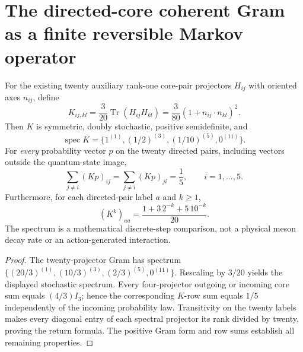 \documentclass[12pt,a4paper]{article}
\begin{document}
\section{The directed-core coherent Gram as a finite reversible Markov operator}
\label{p4b:sec:cc20-core-pair-markov}
\begin{proposition}
\label{p4b:prop:cc20-directed-pair-markov}
For the existing twenty auxiliary rank-one core-pair projectors
$H_{ij}$ with oriented axes $n_{ij}$, define
\[
 K_{ij,kl}=\frac3{20}\operatorname{Tr}(H_{ij}H_{kl})
 =\frac3{80}(1+n_{ij}\cdot n_{kl})^2.
\]
Then $K$ is symmetric, doubly stochastic, positive semidefinite, and
\[
 \boxed{\operatorname{spec}K
 =\{1^{(1)},(1/2)^{(3)},(1/10)^{(5)},0^{(11)}\}.}
\]
For \emph{every} probability vector $p$ on the twenty directed pairs,
including vectors outside the quantum-state image,
\[
 \sum_{j\ne i}(Kp)_{ij}=\sum_{j\ne i}(Kp)_{ji}=\frac15,
\qquad i=1,\ldots,5.
\]
Furthermore, for each directed-pair label $a$ and $k\ge1$,
\[
 (K^k)_{aa}=\frac{1+3\,2^{-k}+5\,10^{-k}}{20}.
\]
The spectrum is a mathematical discrete-step comparison, not a
physical meson decay rate or an action-generated interaction.
\end{proposition}
\begin{proof}
The twenty-projector Gram has spectrum
$\{(20/3)^{(1)},(10/3)^{(3)},(2/3)^{(5)},0^{(11)}\}$.
Rescaling by $3/20$ yields the displayed stochastic spectrum.
Every four-projector outgoing or incoming core sum equals
$(4/3)I_3$; hence the corresponding $K$-row sum equals $1/5$
independently of the incoming probability law.  Transitivity on the
twenty labels makes every diagonal entry of each spectral projector
its rank divided by twenty, proving the return formula.  The
positive Gram form and row sums establish all remaining properties.
\end{proof}



\end{document}
